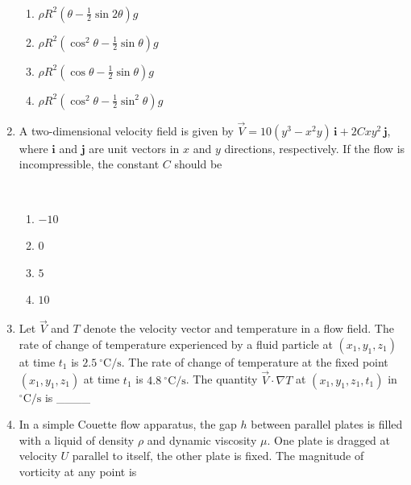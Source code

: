 \documentclass[journal,12pt,onecolumn]{IEEEtran}
\begin{document}
\begin{enumerate}[label=\arabic*)]
\hfill{} \\
\vspace{0.2cm}
\begin{enumerate}[label=\alph*)]
\item $\rho R^2 \left(\theta - \frac{1}{2} \sin 2\theta \right) g$
\item $\rho R^2 \left(\cos^2 \theta - \frac12 \sin \theta \right) g$
\item $\rho R^2 \left(\cos \theta - \frac12 \sin \theta \right) g$
\item $\rho R^2 \left(\cos^2 \theta - \frac12 \sin^2 \theta \right) g$
\end{enumerate}

\newpage

\item A two-dimensional velocity field is given by  
$\vec{V} = 10(y^3 - x^2 y) \, \mathbf{i} + 2C x y^2 \, \mathbf{j}$, where $\mathbf{i}$ and $\mathbf{j}$ are unit vectors in $x$ and $y$ directions, respectively. If the flow is incompressible, the constant $C$ should be  

\hfill{} \\
\vspace{0.2cm}
\begin{enumerate}[label=\alph*)]
\item $-10$
\item $0$
\item $5$
\item $10$
\end{enumerate}
\vspace{0.5cm}

\item Let $\vec{V}$ and $T$ denote the velocity vector and temperature in a flow field. The rate of change of temperature experienced by a fluid particle at $(x_1, y_1, z_1)$ at time $t_1$ is $2.5 \ ^\circ\mathrm{C/s}$. The rate of change of temperature at the fixed point $(x_1, y_1, z_1)$ at time $t_1$ is $4.8 \ ^\circ\mathrm{C/s}$. The quantity $\vec{V} \cdot \nabla T$ at $(x_1, y_1, z_1, t_1)$ in $^\circ\mathrm{C/s}$ is \_\_\_\_
\hfill{} \\

\vspace{0.5cm}

\item In a simple Couette flow apparatus, the gap $h$ between parallel plates is filled with a liquid of density $\rho$ and dynamic viscosity $\mu$. One plate is dragged at velocity $U$ parallel to itself, the other plate is fixed. The magnitude of vorticity at any point is  


\end{enumerate}
\end{document}
